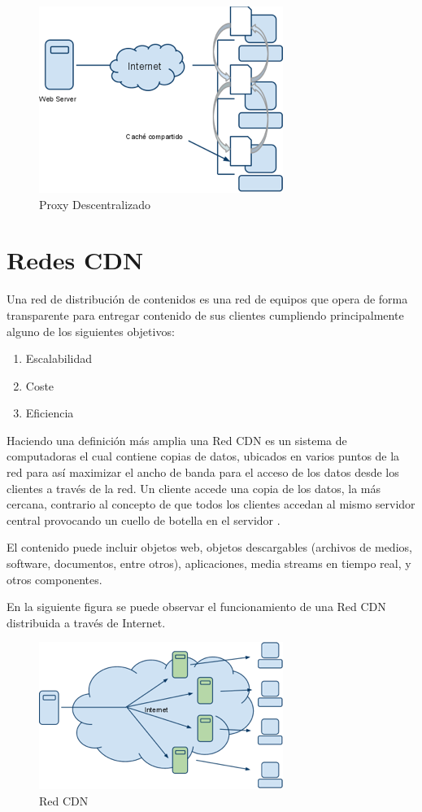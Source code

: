 \begin{figure}[h]
  \centering
    \includegraphics[scale=1]{gfx/proxy_descentralizado}
  \caption{Proxy Descentralizado}
  \label{proxy_descentralizado}
\end{figure}

\section{Redes CDN}
Una red de distribución de contenidos es una red de equipos que opera de forma transparente para entregar contenido de sus clientes cumpliendo principalmente alguno de los siguientes objetivos:
\begin{enumerate}
\item Escalabilidad
\item Coste
\item Eficiencia
\end{enumerate}

Haciendo una definición más amplia una Red CDN es un sistema de computadoras el cual contiene copias de datos, ubicados en varios puntos de la red para así maximizar el ancho de banda para el acceso de los datos desde los clientes a través de la red. Un cliente accede una copia de los datos, la más cercana, contrario al concepto de que todos los clientes accedan al mismo servidor central provocando un cuello de botella en el servidor \cite{wiki_cdn}.

El contenido puede incluir objetos web, objetos descargables (archivos de medios, software, documentos, entre otros), aplicaciones, media streams en tiempo real, y otros componentes.

En la siguiente figura se puede observar el funcionamiento de una Red CDN distribuida a través de Internet.

\begin{figure}[h]
  \centering
    \includegraphics[scale=1]{gfx/redes_cdn}
  \caption{Red CDN}
  \label{conexionhttp}
\end{figure}
